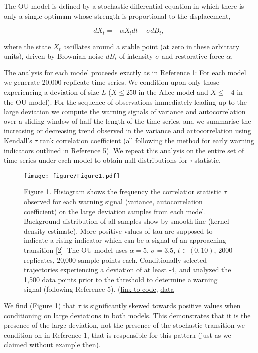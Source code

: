 \documentclass[review]{elsarticle} %
\makeatletter
\def\maxwidth{\ifdim\Gin@nat@width>\linewidth\linewidth
\else\Gin@nat@width\fi}
\let\Oldincludegraphics\includegraphics
\renewcommand{\includegraphics}[1]{\Oldincludegraphics[width=\maxwidth]{#1}}
\makeatother
\begin{document}
The OU model is defined by a stochastic differential equation in which
there is only a single optimum whose strength is proportional to the
displacement,

\[ dX_t = - \alpha X_t dt + \sigma dB_t, \]

where the state $X_t$ oscillates around a stable point (at zero in these
arbitrary units), driven by Brownian noise $dB_t$ of intensity $\sigma$
and restorative force $\alpha$.

The analysis for each model proceeds exactly as in Reference 1: For each
model we generate 20,000 replicate time series. We condition upon only
those experiencing a deviation of size $L$ ($X \leq 250$ in the Allee
model and $X \leq -4$ in the OU model). For the sequence of observations
immediately leading up to the large deviation we compute the warning
signals of variance and autocorrelation over a sliding window of half
the length of the time-series, and we summarise the increasing or
decreasing trend observed in the variance and autocorrelation using
Kendall's $\tau$ rank correlation coefficient (all following the method
for early warning indicators outlined in Reference 5). We repeat this
analysis on the entire set of time-series under each model to obtain
null distributions for $\tau$ statistic.

\begin{figure}[htbp]
\centering
\texttt{[image: figure/Figure1.pdf]}
\caption{Figure 1. Histogram shows the frequency the correlation
statistic $\tau$ observed for each warning signal (variance,
autocorrelation coefficient) on the large deviation samples from each
model. Background distribution of all samples show by smooth line
(kernel density estimate). More positive values of tau are supposed to
indicate a rising indicator which can be a signal of an approaching
transition {[}2{]}. The OU model uses $\alpha = 5$, $\sigma=3.5$,
$t \in (0, 10)$, 2000 replicates, 20,000 sample points each.
Conditionally selected trajectories experiencing a deviation of at least
-4, and analyzed the 1,500 data points prior to the threshold to
determine a warning signal (following Reference 5).
(\href{https://raw.github.com/cboettig/earlywarning/68f7bba05586d425f1bbfcdb1fe66f0597a3d35b/inst/doc/Figure1.Rmd}{link
to code},
\href{https://raw.github.com/cboettig/earlywarning/68f7bba05586d425f1bbfcdb1fe66f0597a3d35b/inst/doc/Figure1.csv}{data}}
\end{figure}

We find (Figure 1) that $\tau$ is significantly skewed towards positive
values when conditioning on large deviations in both models. This
demonstrates that it is the presence of the large deviation, not the
presence of the stochastic transition we condition on in Reference 1,
that is responsible for this pattern (just as we claimed without example
then).
\end{document}
